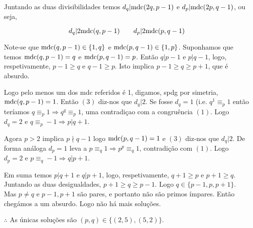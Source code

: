 \documentclass[repertorio-solutions-1.tex]{subfiles}
\begin{document}
\begin{solution}
Juntando as duas divisibilidades temos $d_q|\text{mdc}(2q,p-1)$ e $d_p|\text{mdc}(2p,q-1)$, ou seja,

\begin{equation}
d_q|2\text{mdc}(q,p-1)\qquad d_p|2\text{mdc}(p,q-1)
\end{equation}

Note-se que $\text{mdc}(q,p-1)\in\{1,q\}$ e $\text{mdc}(p,q-1)\in\{1,p\}$.
Suponhamos que temos $\text{mdc}(q,p-1)=q$ e $\text{mdc}(p,q-1)=p$.
Então $q|p-1$ e $p|q-1$, logo, respetivamente, $p-1\geq q$ e $q-1\geq p$.
Isto implica $p-1\geq q\geq p+1$, que é absurdo.

Logo pelo menos um dos mdc referidos é 1, digamos, spdg por simetria, $\text{mdc}(q,p-1)=1$.
Então $(3)$ diz-nos que $d_q|2$.
Se fosse $d_q=1$ (i.e. $q^1\equiv_p 1$ então teríamos $q\equiv_p 1\Rightarrow q^q\equiv_p 1$, uma contradiçao com a congruência $(1)$.
Logo $d_q=2$ e $q\equiv_p -1\Rightarrow p|q+1$.

Agora $p>2$ implica $p\nmid q-1$ logo $\text{mdc}(p,q-1)=1$ e $(3)$ diz-nos que $d_q|2$. De forma análoga $d_p=1$ leva a $p\equiv_q 1\Rightarrow p^p\equiv_q 1$, contradição com $(1)$. Logo $d_p=2$ e $p\equiv_q -1\Rightarrow q|p+1$.

Em suma temos $p|q+1$ e $q|p+1$, logo, respetivamente, $q+1\geq p$ e $p+1\geq q$.
Juntando as duas desigualdades, $p+1\geq q\geq p-1$.
Logo $q\in\{p-1,p,p+1\}$.
Mas $p\neq q$ e $p-1,p+1$ são pares, e portanto não são primos ímpares. Então chegámos a um absurdo. Logo não há mais soluções.

$\therefore$ As únicas soluções são $(p,q)\in\{(2,5),(5,2)\}$.
\end{solution}
\end{document}

